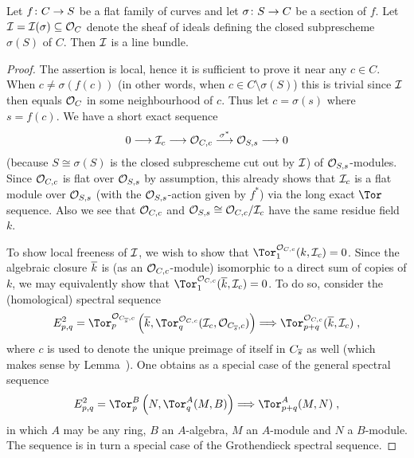 \documentclass[a4paper,parskip=half,numbers=enddot, DIV=12]{scrreprt}
\begin{document}
\begin{lem}
	Let $f\colon C\morphism S$ be a flat family of curves and let $\sigma\colon S\morphism C$ be a section of $f$. Let $\mathcal{I}=\mathcal{I}(\sigma)\subseteq \mathcal{O}_C$ denote the sheaf of ideals defining the closed subprescheme $\sigma(S)$ of $C$. Then $\mathcal{I}$ is a line bundle.
\end{lem}
\begin{proof}
	The assertion is local, hence it is sufficient to prove it near any $c\in C$. When $c\neq \sigma(f(c))$ (in other words, when $c\in C\setminus \sigma(S)$) this is trivial since $\mathcal{I}$ then equals $\mathcal{O}_C$ in some neighbourhood of $c$. Thus let $c=\sigma(s)$ where $s=f(c)$. We have a short exact sequence
	\begin{align}\lbl{eq:s(S)closedSES}
		0\morphism \Ii_c\morphism \Oo_{C,c}\morphism[\sigma^*]\Oo_{S,s}\morphism 0
	\end{align}
	(because $S\cong \sigma(S)$ is the closed subprescheme cut out by $\mathcal{I}$) of $\mathcal{O}_{S,s}$-modules. Since $\mathcal{O}_{C,c}$ is flat over $\mathcal{O}_{S,s}$ by assumption, this already shows that $\mathcal{I}_c$ is a flat module over $\mathcal{O}_{S,s}$ (with the $\mathcal{O}_{S,s}$-action given by $f^*$) via the long exact $\Tor$ sequence. Also we see that $\mathcal{O}_{C,c}$ and $\mathcal{O}_{S,s}\cong \mathcal{O}_{C,c}/\mathcal{I}_c$ have the same residue field $k$.
	
	To show local freeness of $\mathcal{I}$, we wish to show that $\Tor_1^{\Oo_{C,c}}(k,\Ii_c)=0$. Since the algebraic closure $\overline{k}$ is (as an $\mathcal{O}_{C,c}$-module) isomorphic to a direct sum of copies of $k$, we may equivalently show that $\Tor_1^{\Oo_{C,c}}(\ov{k},\Ii_c)=0$. To do so, consider the (homological) spectral sequence
	\begin{align}\lbl{eq:TorSS1}
		E_{p,q}^2=\Tor_p^{\Oo_{C_{\ov{s}},c}}\left(\ov{k},\Tor_q^{\Oo_{C,c}}(\Ii_c,\Oo_{C_{\ov{s}},c})\right)\converge\Tor_{p+q}^{\Oo_{C,c}}(\ov{k},\Ii_c)\;,
	\end{align}
	where $c$ is used to denote the unique preimage of itself in $C_{\overline{s}}$ as well (which makes sense by Lemma~).	One obtains  as a special case of the general spectral sequence
	\begin{align}\lbl{eq:TorGrothendieckSS}
		E_{p,q}^2=\Tor_p^B\left(N,\Tor_q^A(M,B)\right)\converge\Tor_{p+q}^A(M,N)\;,
	\end{align}
	in which $A$ may be any ring, $B$ an $A$-algebra, $M$ an $A$-module and $N$ a $B$-module. The sequence  is in turn a special case of the Grothendieck spectral sequence. 
	

\end{proof}
\end{document}
